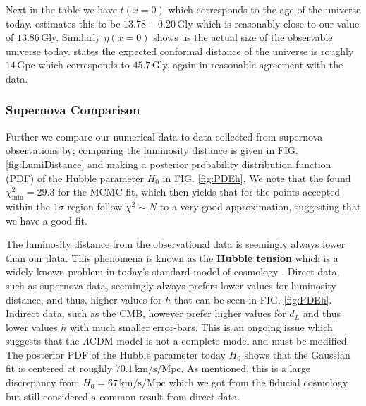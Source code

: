\documentclass[%
reprint,
 amsmath,amssymb,
 aps,
]{revtex4-2}
\begin{document}
Next in the table we have $t(x=0)$ which corresponds to the age of the universe today. \cite{Planck:2018vyg} estimates this to be $13.78\pm0.20\,$Gly which is reasonably close to our value of $13.86\,$Gly. Similarly $\eta(x=0)$ shows us the actual size of the observable universe today. \cite{Gott:2003pf} states the expected conformal distance of the universe is roughly $14\,$Gpc which corresponds to $45.7\,$Gly, again in reasonable agreement with the data. 
\subsubsection{Supernova Comparison}
Further we compare our numerical data to data collected from supernova observations \cite{SDSS:2014iwm} by; comparing the luminosity distance is given in FIG. \ref{fig:LumiDistance} and making a posterior probability distribution function (PDF) of the Hubble parameter $H_0$ in FIG. \ref{fig:PDEh}. We note that the found $\chi^2_\text{min}=29.3$ for the MCMC fit, which then yields that for the points accepted within the $1\sigma$ region follow $\chi^2\sim N$ to a very good approximation, suggesting that we have a good fit. 

The luminosity distance from the observational data is seemingly always lower than our data. This phenomena is known as the \textbf{Hubble tension} which is a widely known problem in today's standard model of cosmology \cite{Di_Valentino_2021}. Direct data, such as supernova data, seemingly always prefers lower values for luminosity distance, and thus, higher values for $h$ that can be seen in FIG. \ref{fig:PDEh}. Indirect data, such as the CMB, however prefer higher values for $d_L$ and thus lower values $h$ with much smaller error-bars. This is an ongoing issue which suggests that the $\Lambda$CDM model is not a complete model and must be modified. The posterior PDF of the Hubble parameter today $H_0$ shows that the Gaussian fit is centered at roughly $70.1\,\text{km/s/Mpc}$. As mentioned, this is a large discrepancy from $H_0=67\,\text{km/s/Mpc}$ which we got from the fiducial cosmology but still considered a common result from direct data. 
\end{document}
